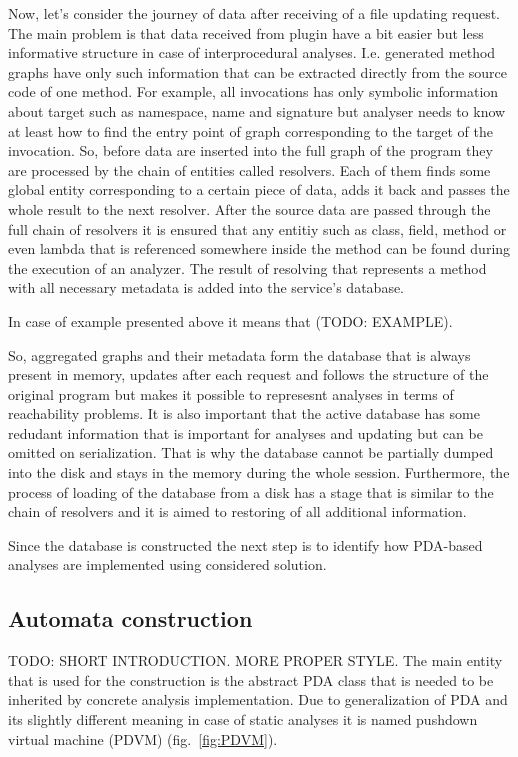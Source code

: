 Now, let's consider the journey of data after receiving of a file updating request.
The main problem is that data received from plugin have a bit easier but less informative structure in case of interprocedural analyses.
I.e. generated method graphs have only such information that can be extracted directly from the source code of one method.
For example, all invocations has only symbolic information about target such as namespace, name and signature but analyser needs to know at least how to find the entry point of graph corresponding to the target of the invocation.
So, before data are inserted into the full graph of the program they are processed by the chain of entities called resolvers.
Each of them finds some global entity corresponding to a certain piece of data, adds it back and passes the whole result to the next resolver.
After the source data are passed through the full chain of resolvers it is ensured that any entitiy such as class, field, method or even lambda that is referenced somewhere inside the method can be found during the execution of an analyzer.
The result of resolving that represents a method with all necessary metadata is added into the service's database.

In case of example presented above it means that (TODO: EXAMPLE).

So, aggregated graphs and their metadata form the database that is always present in memory, updates after each request and follows the structure of the original program but makes it possible to represesnt analyses in terms of reachability problems.
It is also important that the active database has some redudant information that is important for analyses and updating but can be omitted on serialization.
That is why the database cannot be partially dumped into the disk and stays in the memory during the whole session.
Furthermore, the process of loading of the database from a disk has a stage that is similar to the chain of resolvers and it is aimed to restoring of all additional information.

Since the database is constructed the next step is to identify how PDA-based analyses are implemented using considered solution.

\subsection{Automata construction}

TODO: SHORT INTRODUCTION. MORE PROPER STYLE.
The main entity that is used for the construction is the abstract PDA class that is needed to be inherited by concrete analysis implementation.
Due to generalization of PDA and its slightly different meaning in case of static analyses it is named pushdown virtual machine (PDVM) (fig.~\ref{fig:PDVM}).

